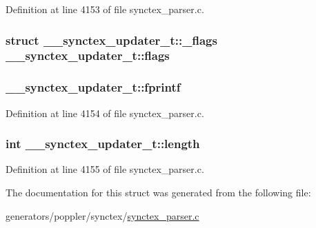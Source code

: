 Definition at line 4153 of file synctex\+\_\+parser.\+c.

\hypertarget{struct____synctex__updater__t_a1de70c5930356a900a1d2abe4255b8d4}{
\subsubsection[{flags}]{\setlength{\rightskip}{0pt plus 5cm}struct {\bf \+\_\+\+\_\+synctex\+\_\+updater\+\_\+t\+::\+\_\+flags}  \+\_\+\+\_\+synctex\+\_\+updater\+\_\+t\+::flags}}\label{struct____synctex__updater__t_a1de70c5930356a900a1d2abe4255b8d4}
\hypertarget{struct____synctex__updater__t_a46b15c92f83b585176dc0b39bce363c3}{
\subsubsection[{fprintf}]{ \+\_\+\+\_\+synctex\+\_\+updater\+\_\+t\+::fprintf}}\label{struct____synctex__updater__t_a46b15c92f83b585176dc0b39bce363c3}


Definition at line 4154 of file synctex\+\_\+parser.\+c.

\hypertarget{struct____synctex__updater__t_ae675c2ae1794c2f15d7a492253bb38e5}{
\subsubsection[{length}]{\setlength{\rightskip}{0pt plus 5cm}int \+\_\+\+\_\+synctex\+\_\+updater\+\_\+t\+::length}}\label{struct____synctex__updater__t_ae675c2ae1794c2f15d7a492253bb38e5}


Definition at line 4155 of file synctex\+\_\+parser.\+c.



The documentation for this struct was generated from the following file\+:\begin{DoxyCompactItemize}
\item 
generators/poppler/synctex/\hyperlink{synctex__parser_8c}{synctex\+\_\+parser.\+c}\end{DoxyCompactItemize}
